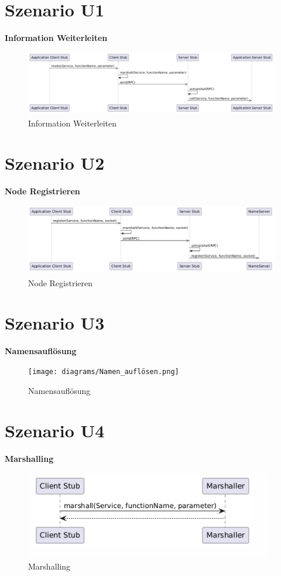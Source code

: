 \section{Szenario U1}
\textbf{Information Weiterleiten}\\
\begin{figure}[h!]
    \centering
    \includegraphics[width=0.8\linewidth]{diagrams/Information_Weiterleiten.png}
    \caption{Information Weiterleiten}
    \label{fig:Information_Weiterleiten}
\end{figure}


\section{Szenario U2}
\textbf{Node Registrieren}\\
\begin{figure}[h!]
    \centering
    \includegraphics[width=0.8\linewidth]{diagrams/Node_Registrieren.png}
    \caption{Node Registrieren}
    \label{fig:Node_Registrieren}
\end{figure}

\section{Szenario U3}
\textbf{Namensauflösung}\\
\begin{figure}[h!]
    \centering
    \texttt{[image: diagrams/Namen\_auflösen.png]}
    \caption{Namensauflösung}
    \label{fig:Namensauflösung}
\end{figure}


\section{Szenario U4}
\textbf{Marshalling}\\
\begin{figure}[h!]
    \centering
    \includegraphics[width=0.8\linewidth]{diagrams/Marshalling.png}
    \caption{Marshalling}
    \label{fig:Marshalling}
\end{figure}

